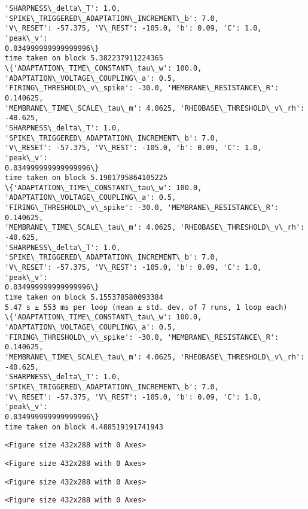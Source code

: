 \begin{Verbatim}[commandchars=\\\{\}]
'SHARPNESS\_delta\_T': 1.0, 'SPIKE\_TRIGGERED\_ADAPTATION\_INCREMENT\_b': 7.0,
'V\_RESET': -57.375, 'V\_REST': -105.0, 'b': 0.09, 'C': 1.0, 'peak\_v':
0.034999999999999996\}
time taken on block 5.382237911224365
\{'ADAPTATION\_TIME\_CONSTANT\_tau\_w': 100.0, 'ADAPTATION\_VOLTAGE\_COUPLING\_a': 0.5,
'FIRING\_THRESHOLD\_v\_spike': -30.0, 'MEMBRANE\_RESISTANCE\_R': 0.140625,
'MEMBRANE\_TIME\_SCALE\_tau\_m': 4.0625, 'RHEOBASE\_THRESHOLD\_v\_rh': -40.625,
'SHARPNESS\_delta\_T': 1.0, 'SPIKE\_TRIGGERED\_ADAPTATION\_INCREMENT\_b': 7.0,
'V\_RESET': -57.375, 'V\_REST': -105.0, 'b': 0.09, 'C': 1.0, 'peak\_v':
0.034999999999999996\}
time taken on block 5.1901795864105225
\{'ADAPTATION\_TIME\_CONSTANT\_tau\_w': 100.0, 'ADAPTATION\_VOLTAGE\_COUPLING\_a': 0.5,
'FIRING\_THRESHOLD\_v\_spike': -30.0, 'MEMBRANE\_RESISTANCE\_R': 0.140625,
'MEMBRANE\_TIME\_SCALE\_tau\_m': 4.0625, 'RHEOBASE\_THRESHOLD\_v\_rh': -40.625,
'SHARPNESS\_delta\_T': 1.0, 'SPIKE\_TRIGGERED\_ADAPTATION\_INCREMENT\_b': 7.0,
'V\_RESET': -57.375, 'V\_REST': -105.0, 'b': 0.09, 'C': 1.0, 'peak\_v':
0.034999999999999996\}
time taken on block 5.155378580093384
5.47 s ± 553 ms per loop (mean ± std. dev. of 7 runs, 1 loop each)
\{'ADAPTATION\_TIME\_CONSTANT\_tau\_w': 100.0, 'ADAPTATION\_VOLTAGE\_COUPLING\_a': 0.5,
'FIRING\_THRESHOLD\_v\_spike': -30.0, 'MEMBRANE\_RESISTANCE\_R': 0.140625,
'MEMBRANE\_TIME\_SCALE\_tau\_m': 4.0625, 'RHEOBASE\_THRESHOLD\_v\_rh': -40.625,
'SHARPNESS\_delta\_T': 1.0, 'SPIKE\_TRIGGERED\_ADAPTATION\_INCREMENT\_b': 7.0,
'V\_RESET': -57.375, 'V\_REST': -105.0, 'b': 0.09, 'C': 1.0, 'peak\_v':
0.034999999999999996\}
time taken on block 4.488519191741943
    \end{Verbatim}

    
    \begin{verbatim}
<Figure size 432x288 with 0 Axes>
    \end{verbatim}

    
    
    \begin{verbatim}
<Figure size 432x288 with 0 Axes>
    \end{verbatim}

    
    
    \begin{verbatim}
<Figure size 432x288 with 0 Axes>
    \end{verbatim}

    
    
    \begin{verbatim}
<Figure size 432x288 with 0 Axes>
    \end{verbatim}

